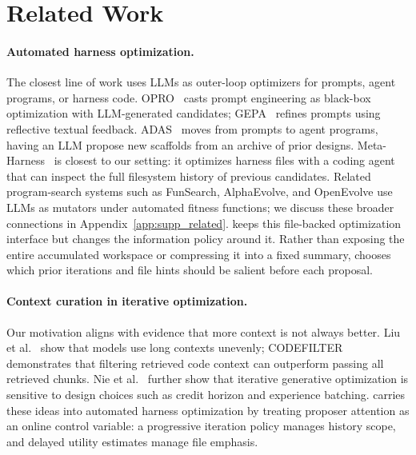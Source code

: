 \section{Related Work}
\label{sec:related}

\paragraph{Automated harness optimization.}
The closest line of work uses LLMs as outer-loop optimizers for prompts,
agent programs, or harness code. OPRO~\cite{yang2024opro} casts prompt
engineering as black-box optimization with LLM-generated candidates;
GEPA~\cite{agrawal2025gepa} refines prompts using reflective textual
feedback. ADAS~\cite{hu2024adas} moves from prompts to agent programs,
having an LLM propose new scaffolds from an archive of prior designs.
Meta-Harness~\cite{lee2026metaharness} is closest to our setting: it
optimizes harness files with a coding agent that can inspect the full
filesystem history of previous candidates. Related program-search systems
such as FunSearch, AlphaEvolve, and OpenEvolve use LLMs as mutators under
automated fitness functions; we discuss these broader connections in
Appendix~\ref{app:supp_related}. \name keeps this file-backed optimization
interface but changes the information policy around it. Rather than exposing
the entire accumulated workspace or compressing it into a fixed summary,
\name chooses which prior iterations and file hints should be salient before
each proposal.

\paragraph{Context curation in iterative optimization.}
Our motivation aligns with evidence that more context is not always better.
Liu et al.~\cite{liu2024lost} show that models use long contexts unevenly;
CODEFILTER~\cite{li2025codefilter} demonstrates that filtering retrieved code
context can outperform passing all retrieved chunks. Nie et
al.~\cite{nie2026learningloop} further show that iterative generative
optimization is sensitive to design choices such as credit horizon and
experience batching. \name carries these ideas into automated harness
optimization by treating proposer attention as an online control variable: a
progressive iteration policy manages history scope, and delayed utility
estimates manage file emphasis.
